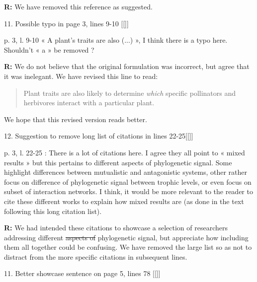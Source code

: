 \documentclass[12pt]{letter}
\newenvironment{refquote}{\bigskip \begin{it}}{\end{it}\smallskip}
\providecommand{\DIFadd}[1]{{\protect\color{blue}\uwave{#1}}} %
\providecommand{\DIFdel}[1]{{\protect\color{red}\sout{#1}}}                      %
\providecommand{\DIFaddbegin}{} %
\providecommand{\DIFaddend}{} %
\providecommand{\DIFdelbegin}{} %
\providecommand{\DIFdelend}{} %
\newcommand{\DIFscaledelfig}{0.5}
\newlength{\DIFdelgraphicswidth} %
\newlength{\DIFdelgraphicsheight} %
\newcommand{\DIFaddincludegraphics}[2][]{{\color{blue}\fbox{\DIFOincludegraphics[#1]{#2}}}} %
\newcommand{\DIFdelincludegraphics}[2][]{%
\sbox{\DIFdelgraphicsbox}{\DIFOincludegraphics[#1]{#2}}%
\settoboxwidth{\DIFdelgraphicswidth}{\DIFdelgraphicsbox} %
\settoboxtotalheight{\DIFdelgraphicsheight}{\DIFdelgraphicsbox} %
\scalebox{\DIFscaledelfig}{%
\parbox[b]{\DIFdelgraphicswidth}{\usebox{\DIFdelgraphicsbox}\\[-\baselineskip] \rule{\DIFdelgraphicswidth}{0em}}\llap{\resizebox{\DIFdelgraphicswidth}{\DIFdelgraphicsheight}{%
\setlength{\unitlength}{\DIFdelgraphicswidth}%
\begin{picture}(1,1)%
\thicklines\linethickness{2pt} %
{\color[rgb]{1,0,0}\put(0,0){\framebox(1,1){}}}%
{\color[rgb]{1,0,0}\put(0,0){\line( 1,1){1}}}%
{\color[rgb]{1,0,0}\put(0,1){\line(1,-1){1}}}%
\end{picture}%
}\hspace*{3pt}}} %
} %
\DeclareRobustCommand{\DIFaddbegin}{\DIFOaddbegin \let\includegraphics\DIFaddincludegraphics} %
\DeclareRobustCommand{\DIFaddend}{\DIFOaddend \let\includegraphics\DIFOincludegraphics} %
\DeclareRobustCommand{\DIFdelbegin}{\DIFOdelbegin \let\includegraphics\DIFdelincludegraphics} %
\DeclareRobustCommand{\DIFdelend}{\DIFOaddend \let\includegraphics\DIFOincludegraphics} %
\begin{document}
	\textbf{R:} We have removed this reference as suggested.


11. Possible typo in page 3, lines 9-10 \DIFaddbegin [[\DIFadd{done}]]
	\DIFaddend 

	\begin{refquote}
		p. 3, l. 9-10 « A plant’s traits are also (...) », I think there is a typo here. Shouldn’t « a » be removed ?
	\end{refquote}


	\textbf{R:} We do not believe that the original formulation was incorrect, but agree that it was inelegant. We have revised this line to read:
	\DIFdelbegin %

\DIFdelend \begin{quotation}
		Plant traits are also likely to determine \emph{which} specific pollinators and herbivores interact with a particular plant.
  	\end{quotation}
  	\DIFdelbegin %

\DIFdelend We hope that this revised version reads better.


12. \DIFaddbegin \DIFadd{?}\DIFaddend Suggestion to remove long list of citations in lines 22-25\DIFaddbegin \DIFadd{? }[[\DIFadd{done}]]
\DIFaddend 

	\begin{refquote}
		p. 3, l. 22-25 : There is a lot of citations here. I agree they all point to « mixed results » but this pertains to different aspects of phylogenetic signal. Some highlight differences between mutualistic and antagonistic systems, other rather focus on difference of phylogenetic signal between trophic levels, or even focus on subset of interaction networks. I think, it would be more relevant to the reader to cite these different works to explain how mixed results are (as done in the text following this long citation list).
	\end{refquote}


	\textbf{R:} We had intended these citations to showcase a selection of researchers addressing different \DIFdelbegin \DIFdel{aspects of }\DIFdelend \DIFaddbegin \DIFadd{aspectsof }\DIFaddend phylogenetic signal, but appreciate how including them all together could be confusing. We have removed the large list so as not to distract from the more specific citations in subsequent lines.


11. Better showcase sentence on page 5, lines 78 \DIFaddbegin [[\DIFadd{done}]]
\DIFaddend 
\end{document}
